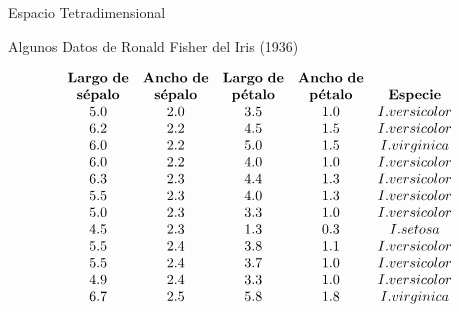 \documentclass[10pd,hyperref={colorlinks=true}]{beamer}
\begin{document}
 \begin{frame}{Espacio Tetradimensional}

\centerline{Algunos Datos de Ronald Fisher del Iris (1936)}

 $$
 \begin{array}{ccccc}
 \bf Largo\ de & \bf Ancho\ de & \bf Largo\ de & \bf Ancho\ de & \\
 \textbf{s\'epalo} & \textbf{s\'epalo} & \textbf{p\'etalo} & \textbf{p\'etalo} & \bf Especie \\
 5.0 & 2.0 & 3.5 & 1.0 & I. versicolor \\
 6.2 & 2.2 & 4.5 & 1.5 & I. versicolor \\
 6.0 & 2.2 & 5.0 & 1.5 & I. virginica  \\
 6.0 & 2.2 & 4.0 & 1.0 & I. versicolor \\
 6.3 & 2.3 & 4.4 & 1.3 & I. versicolor \\
 5.5 & 2.3 & 4.0 & 1.3 & I. versicolor \\
 5.0 & 2.3 & 3.3 & 1.0 & I. versicolor \\
 4.5 & 2.3 & 1.3 & 0.3 & I. setosa     \\
 5.5 & 2.4 & 3.8 & 1.1 & I. versicolor \\
 5.5 & 2.4 & 3.7 & 1.0 & I. versicolor \\
 4.9 & 2.4 & 3.3 & 1.0 & I. versicolor \\
 6.7 & 2.5 & 5.8 & 1.8 & I. virginica
 \end{array}
 $$

 \end{frame}


 \begin{frame}{}

 \vfill
 \centerline{}

 \centerline{}
 \vfill

 \end{frame}


 \begin{frame}{}

 \vfill
 \centerline{}

 \centerline{}
 \vfill

 \end{frame}
\end{document}
